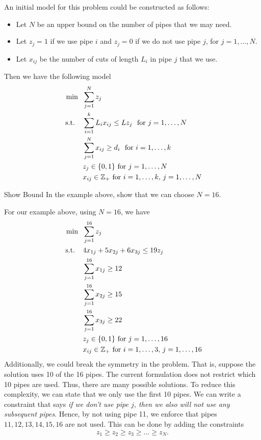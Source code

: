 An initial model for this problem could be constructed as follows:  
\begin{itemize}
\item Let $N$ be an upper bound on the number of pipes that we may need.
\item Let $z_j = 1$ if we use pipe $i$ and $z_j = 0$ if we do not use pipe $j$, for $j=1, \dots, N$.
\item Let $x_{ij}$ be the number of cuts of length $L_i$ in pipe $j$ that we use.
\end{itemize}
Then we have the following model
\begin{equation}
\begin{split}
\min\ \  & \sum_{j=1}^N z_j\\
\mbox{ s.t. } \ \  & \sum_{i=1}^k  L_i x_{ij} \leq Lz_j \ \mbox{ for } j=1,\dots, N\\
& \sum_{j=1}^N x_{ij} \geq d_i \ \mbox{ for } i=1, \dots, k\\
& z_j \in \{0,1\} \mbox{ for } j=1, \dots, N\\
& x_{ij} \in {\mathbb{Z}}_+ \mbox{ for } i=1, \dots, k,\, j=1, \dots, N
\end{split}
\end{equation}
\begin{exercise}{Show Bound}{}
In the example above, show that we can choose $N=16$.
\end{exercise}
For our example above, using $N=16$, we have
\begin{equation}
\begin{split}
\min\ \  & \sum_{j=1}^{16} z_j\\
\mbox{ s.t. } \ \  &  4 x_{1j} + 5 x_{2j} + 6 x_{3j} \leq 19 z_j\\
& \sum_{j=1}^{16} x_{1j} \geq 12\\
& \sum_{j=1}^{16} x_{2j} \geq 15\\
& \sum_{j=1}^{16} x_{3j} \geq 22\\
& z_j \in \{0,1\} \mbox{ for } j=1, \dots, 16\\
& x_{ij} \in {\mathbb{Z}}_+ \mbox{ for } i=1, \dots, 3,\, j=1, \dots, 16
\end{split}
\end{equation}
Additionally, we could break the symmetry in the problem.  That is, suppose the solution uses 10 of the 16 pipes.  The current formulation does not restrict which 10 pipes are used.  Thus, there are many possible solutions.  To reduce this complexity, we can state that we only use the first 10 pipes.  We can write a constraint that says \emph{if we don't use pipe $j$, then we also will not use any subsequent pipes}.  Hence, by not using pipe 11, we enforce that pipes $11, 12, 13, 14,15,16$ are not used.  This can be done by adding the constraints
\begin{equation}
z_1 \geq z_2 \geq z_3 \geq \dots \geq z_N.
\end{equation}


